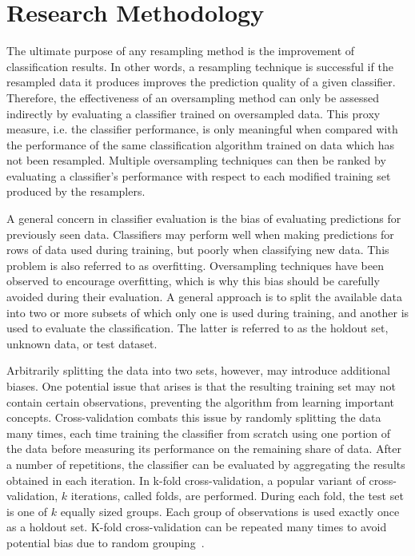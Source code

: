 \documentclass[sort&compress]{elsarticle}
\begin{document}
\section{Research Methodology}
\label{sec:research-methodology}
The ultimate purpose of any resampling method is the improvement of
classification results. In other words, a resampling technique is successful if
the resampled data it produces improves the prediction quality of a given
classifier. Therefore, the effectiveness of an oversampling method can only be
assessed indirectly by evaluating a classifier trained on oversampled data. This
proxy measure, i.e. the classifier performance, is only meaningful when compared
with the performance of the same classification algorithm trained on data which
has not been resampled. Multiple oversampling techniques can then be ranked by
evaluating a classifier's performance with respect to each modified training set
produced by the resamplers.

A general concern in classifier evaluation is the bias of evaluating predictions
for previously seen data. Classifiers may perform well when making predictions
for rows of data used during training, but poorly when classifying new data.
This problem is also referred to as overfitting. Oversampling techniques have
been observed to encourage overfitting, which is why this bias should be
carefully avoided during their evaluation. A general approach is to split the
available data into two or more subsets of which only one is used during
training, and another is used to evaluate the classification. The latter is
referred to as the holdout set, unknown data, or test dataset. 

Arbitrarily splitting the data into two sets, however, may introduce additional
biases. One potential issue that arises is that the resulting training set may
not contain certain observations, preventing the algorithm from learning
important concepts. Cross-validation combats this issue by randomly splitting
the data many times, each time training the classifier from scratch using one
portion of the data before measuring its performance on the remaining share of
data. After a number of repetitions, the classifier can be evaluated by
aggregating the results obtained in each iteration. In k-fold cross-validation,
a popular variant of cross-validation, $k$ iterations, called folds, are
performed. During each fold, the test set is one of $k$ equally sized groups.
Each group of observations is used exactly once as a holdout set. K-fold
cross-validation can be repeated many times to avoid potential bias due to
random grouping~\citep{Japkowicz.2013}.
\end{document}
